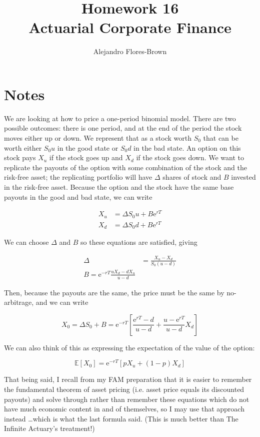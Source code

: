 \documentclass[12pt, letterpaper]{article}
\title{Homework 16 \\ Actuarial Corporate Finance}
\author{Alejandro Flores-Brown}
\newcommand{\e}{\mathrm{e}}
\newcommand{\Ex}[1]{\mathbb{E}\left[#1\right]}
\begin{document}
    \maketitle

    \section{Notes}

    We are looking at how to price a one-period binomial model. There are two possible outcomes: there is one period, and at the end of the period the stock moves either up or down. We represent that as a stock worth \(S_0\) that can be worth either \(S_0 u\) in the good state or \(S_0 d\) in the bad state. An option on this stock pays \(X_u\) if the stock goes up and \(X_d\) if the stock goes down. We want to replicate the payouts of the option with some combination of the stock and the risk-free asset; the replicating portfolio will have \(\Delta\) shares of stock and \(B\) invested in the risk-free asset. Because the option and the stock have the same base payouts in the good and bad state, we can write

    \begin{align*}
    X_u &= \Delta S_0 u + B \e^{rT} \\
    X_d &= \Delta S_0 d + B \e^{rT}
    \end{align*}

    We can choose \(\Delta\) and \(B\) so these equations are satisfied, giving

    \begin{align*}
    \Delta &= \frac{X_u - X_d}{S_0 (u - d)} \\
    B = \e^{-rT} \frac{u X_d - d X_u }{u - d}
    \end{align*}

    Then, because the payouts are the same, the price must be the same by no-arbitrage, and we can write

    \[ X_0 = \Delta S_0 + B = \e^{-rT} \left[\frac{\e^{rT} - d}{u - d} + \frac{u - \e^{rT}}{u - d} X_d \right]    \]

    We can also think of this as expressing the expectation of the value of the option:

    \[ \Ex{X_0} = \e^{-rT} \left[ p X_u + (1 - p) X_d \right]   \]
    
    That being said, I recall from my FAM preparation that it is easier to remember the fundamental theorem of asset pricing (i.e. asset price equals its discounted payouts) and solve through rather than remember these equations which do not have much economic content in and of themselves, so I may use that approach instead \dots which is what the last formula said. (This is much better than The Infinite Actuary's treatment!)
\end{document}
